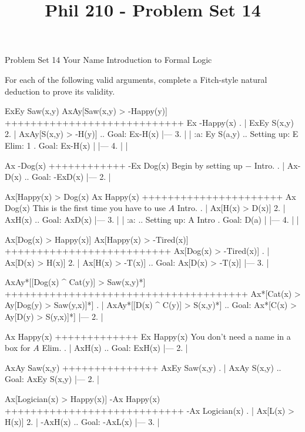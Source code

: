 
\title{Phil 210 - Problem Set 14}

\heading
Problem Set 14
Your Name
Introduction to Formal Logic
\endheading

For each of the following valid arguments, complete a Fitch-style natural deduction to prove its validity.

\quantifiers
\problems
{}
\argument
 ExEy Saw(x,y)
 AxAy[Saw(x,y) > -Happy(y)]
++++++++++++++++++++++++++++
 Ex -Happy(x)
\endargument
        \answer
        . | ExEy S(x,y)
         2. | AxAy[S(x,y) > -H(y)]  ..  Goal: Ex-H(x)
            |---
         3. |   | :a: Ey S(a,y)     ..  Setting up: E Elim: 1  .  Goal: Ex-H(x)
            |   |---
         4. |   |
        \endfitchproof
        \endanswer

\argument
 Ax -Dog(x)
++++++++++++
 -Ex Dog(x)
\endargument
\Hint Begin by setting up $-$ Intro.
        \answer
        . | Ax-D(x)  ..  Goal: -ExD(x)
            |---
         2. | 
        \endfitchproof
        \endanswer

\argument
 Ax[Happy(x) > Dog(x)
 Ax Happy(x)
++++++++++++++++++++++
 Ax Dog(x)
\endargument
\Hint This is the first time you have to use $A$ Intro.
        \answer
        . | Ax[H(x) > D(x)]
         2. | AxH(x)          ..  Goal: AxD(x)
            |---
         3. |   | :a:          ..  Setting up: A Intro  .  Goal: D(a)
            |   |---
         4. |   |
        \endfitchproof
        \endanswer

\argument
 Ax[Dog(x) > Happy(x)]
 Ax[Happy(x) > -Tired(x)]
++++++++++++++++++++++++++
 Ax[Dog(x) > -Tired(x)]
\endargument
        \answer
        . | Ax[D(x) > H(x)]
         2. | Ax[H(x) > -T(x)]  ..  Goal: Ax[D(x) > -T(x)]
            |---
         3. | 
        \endfitchproof
        \endanswer

\argument
 AxAy*[[Dog(x) ^ Cat(y)] > Saw(x,y)*]
++++++++++++++++++++++++++++++++++++++
 Ax*[Cat(x) > Ay[Dog(y) > Saw(y,x)]*]
\endargument
        \answer
        . | AxAy*[[D(x) ^ C(y)] > S(x,y)*]  ..  Goal: Ax*[C(x) > Ay[D(y) > S(y,x)]*]
            |---
         2. | 
        \endfitchproof
        \endanswer

\argument
 Ax Happy(x)
+++++++++++++
 Ex Happy(x)
\endargument
\Hint You don't need a name in a box for $A$ Elim.
        \answer
        . | AxH(x)  ..  Goal: ExH(x)
            |---
         2. | 
        \endfitchproof
        \endanswer

\argument
 AxAy Saw(x,y)
+++++++++++++++
 AxEy Saw(x,y)
\endargument
        \answer
        . | AxAy S(x,y)  ..  Goal: AxEy S(x,y)
            |---
         2. |
        \endfitchproof
        \endanswer

\argument
 Ax[Logician(x) > Happy(x)]
 -Ax Happy(x)
++++++++++++++++++++++++++++
 -Ax Logician(x)
\endargument
        \answer
        . | Ax[L(x) > H(x)]
         2. | -AxH(x)         ..  Goal: -AxL(x)
            |---
         3. |
        \endfitchproof
        \endanswer

\endproblems
\bye
